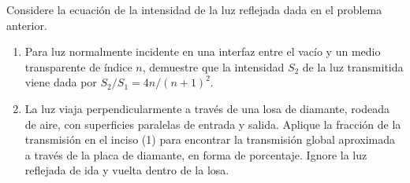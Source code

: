 \item Considere la ecuación de la intensidad de la luz reflejada dada en el problema anterior.
\begin{enumerate}
    \item Para luz normalmente incidente en una interfaz entre el vacío y un medio transparente de índice $n$, demuestre que la intensidad $S_2$ de la luz transmitida viene dada por $S_2/S_1 = 4n / (n+ 1)^2$.
    \item La luz viaja perpendicularmente a través de una losa de diamante, rodeada de aire, con superficies paralelas de entrada y salida. Aplique la fracción de la transmisión en el inciso (1) para encontrar la transmisión global aproximada a través de la placa de diamante, en forma de porcentaje. Ignore la luz reflejada de ida y vuelta dentro de la losa.
\end{enumerate}